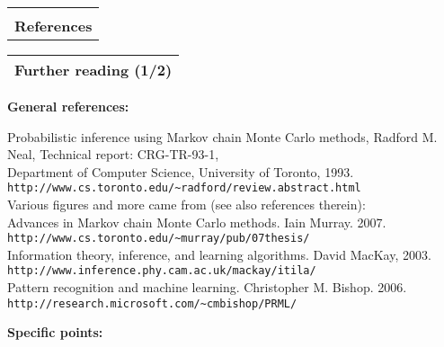 \documentclass[25pt,landscape]{foils}
\newcommand{\Gray}{\textcolor{mygray}}
\newcommand{\myfoilhead}[1]{
\newpage
\vspace*{-1cm}
\Gray{
\begin{tabular*}{\textwidth}{l}
{\bf \Huge #1} \\
\bottomrule
\end{tabular*}}}
\begin{document}
\Gray{
\begin{tabular*}{\textwidth}{l}
\toprule\\
{\bf \Huge References} \\[0.4in]
\bottomrule
\end{tabular*}}

\vfill
\vfill


\myfoilhead{Further reading (1/2)}

\vfill

{\bf General references:}\\[-0.3in]

{\tiny

Probabilistic inference using Markov chain Monte Carlo methods, Radford M. Neal,
Technical report: CRG-TR-93-1,\\Department of Computer Science, University of
Toronto, 1993. \texttt{http://www.cs.toronto.edu/\~{}radford/review.abstract.html}\\[-0.3in]

Various figures and more came from (see also references therein):\\[-0.2in]
Advances in Markov chain Monte Carlo methods. Iain Murray. 2007.
\texttt{http://www.cs.toronto.edu/\~{}murray/pub/07thesis/}\\[-0.2in]
Information theory, inference, and learning algorithms. David MacKay, 2003.
\texttt{http://www.inference.phy.cam.ac.uk/mackay/itila/}\\[-0.2in]
Pattern recognition and machine learning. Christopher M. Bishop. 2006.
\texttt{http://research.microsoft.com/\~{}cmbishop/PRML/}
}

\bigskip

{\bf Specific points:}\\[-0.3in]
\end{document}
